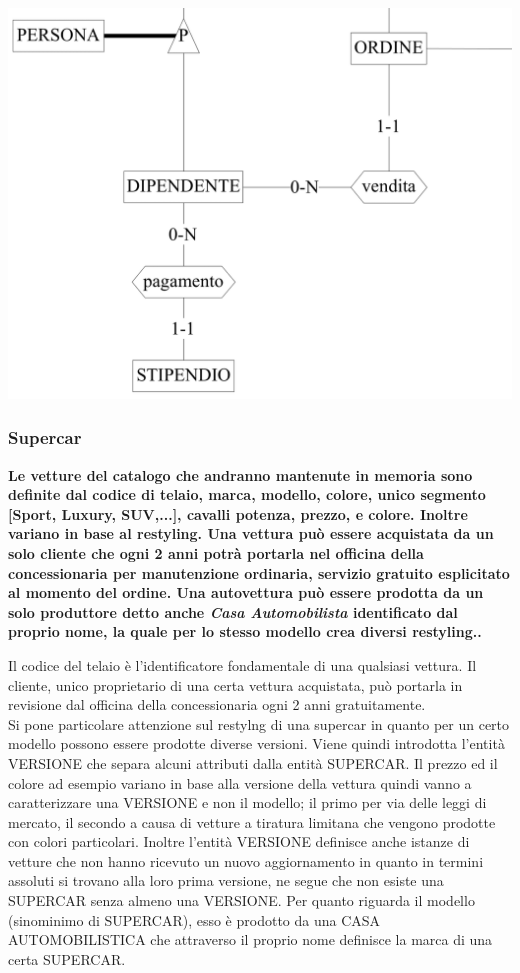 \documentclass[11pt]{article}
\begin{document}
\begin{center}
    \includegraphics[width=\linewidth]{images/partialSchemes/dipendente.png}
\end{center}

\subsubsection{Supercar}
\textbf{Le vetture del catalogo che andranno mantenute in memoria sono definite
dal codice di telaio, marca, modello, colore, unico segmento [Sport, Luxury,
SUV,...], cavalli potenza, prezzo, e colore. Inoltre variano in base al
restyling. Una vettura può essere acquistata da un solo cliente che ogni 2 anni
potrà portarla nel officina della concessionaria per manutenzione ordinaria,
servizio gratuito esplicitato al momento del ordine. Una autovettura può essere
prodotta da un solo produttore detto anche \textit{Casa Automobilista}
identificato dal proprio nome, la quale per lo stesso modello crea diversi
restyling..}

Il codice del telaio è l'identificatore fondamentale di una qualsiasi vettura.
Il cliente, unico proprietario di una certa vettura acquistata, può portarla in
revisione dal officina della concessionaria ogni 2 anni gratuitamente.\\
Si pone particolare attenzione sul restylng di una supercar in quanto per un
certo modello possono essere prodotte diverse versioni. Viene quindi introdotta
l'entità VERSIONE che separa alcuni attributi dalla entità SUPERCAR. Il prezzo
ed il colore ad esempio variano in base alla versione della vettura quindi vanno
a caratterizzare una VERSIONE e non il modello; il primo per via delle leggi di
mercato, il secondo a causa di vetture a tiratura limitana che vengono prodotte
con colori particolari. Inoltre l'entità VERSIONE definisce anche istanze di
vetture che non hanno ricevuto un nuovo aggiornamento in quanto in termini
assoluti si trovano alla loro prima versione, ne segue che non esiste una
SUPERCAR senza almeno una VERSIONE. Per quanto riguarda il modello (sinominimo
di SUPERCAR), esso è prodotto da una CASA AUTOMOBILISTICA che attraverso il
proprio nome definisce la marca di una certa SUPERCAR.
\end{document}
